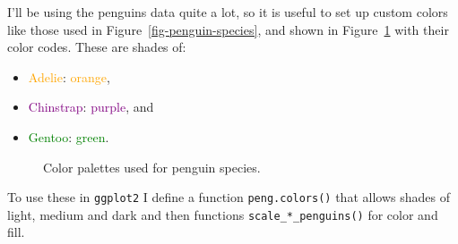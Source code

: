 \documentclass[
  letterpaper,
  10pt,
  krantz2]{krantz}
\providecommand{\tightlist}{%
  \setlength{\itemsep}{0pt}\setlength{\parskip}{0pt}}\usepackage{longtable,booktabs,array}
\begin{document}
{I'll be using the penguins data quite a lot, so it is useful to set up
custom colors like those used in Figure~\ref{fig-penguin-species}, and
shown in Figure~\ref{fig-peng-colors} with their color codes. These are
shades of:

\begin{itemize}
\tightlist
\item
  \textcolor{orange}{Adelie}: \textcolor{orange}{orange},
\item
  \textcolor{purple}{Chinstrap}: \textcolor{purple}{purple}, and
\item
  \textcolor{green}{Gentoo}: \textcolor{green}{green}.
\end{itemize}

\begin{figure}


\caption{\label{fig-peng-colors}Color palettes used for penguin
species.}

\end{figure}%

To use these in \texttt{ggplot2} I define a function
\texttt{peng.colors()} that allows shades of light, medium and dark and
then functions \texttt{scale\_*\_penguins()} for color and fill.

}
\end{document}
